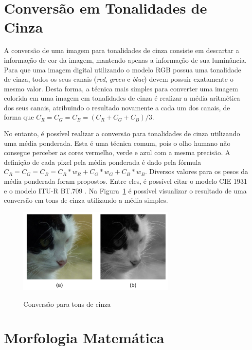 \documentclass[12pt,oneside,a4paper,english,french,spanish,brazil,]{abntex2}
\begin{document}
\section{Conversão em Tonalidades de Cinza}

A conversão de uma imagem para tonalidades de cinza consiste em descartar a informação de cor da imagem, mantendo apenas a informação de sua luminância. Para que uma imagem digital utilizando o modelo RGB possua uma tonalidade de cinza, todos os seus canais (\textit{red}, \textit{green} e \textit{blue}) devem possuir exatamente o mesmo valor. Desta forma, a técnica mais simples para converter uma imagem colorida em uma imagem em tonalidades de cinza é realizar a média aritmética dos seus canais, atribuindo o resultado novamente a cada um dos canais, de forma que \(C_R = C_G = C_B = (C_R + C_G + C_B) / 3\).

No entanto, é possível realizar a conversão para tonalidades de cinza utilizando uma média ponderada. Esta é uma técnica comum, pois o olho humano não consegue perceber as cores vermelho, verde e azul com a mesma precisão. A definição de cada pixel pela média ponderada é dado pela fórmula \(C_R = C_G = C_B = C_R * w_R + C_G * w_G + C_B * w_B\). Diversos valores para os pesos da média ponderada foram propostos. Entre eles, é possível citar o modelo CIE 1931 \cite{broadbent:2004} e o modelo ITU-R BT.709 \cite{anderson:1996}. Na Figura~\ref{fig:PDI_Gray} é possível visualizar o resultado de uma conversão em tons de cinza utilizando a média simples.


\begin{figure}[ht]
\centering
\caption{Conversão para tons de cinza}
\includegraphics[width=0.7\textwidth]{imagens/PDI_Gray.pdf}
\sourceAuthor
\label{fig:PDI_Gray}
\end{figure}

\section{Morfologia Matemática}
\end{document}
